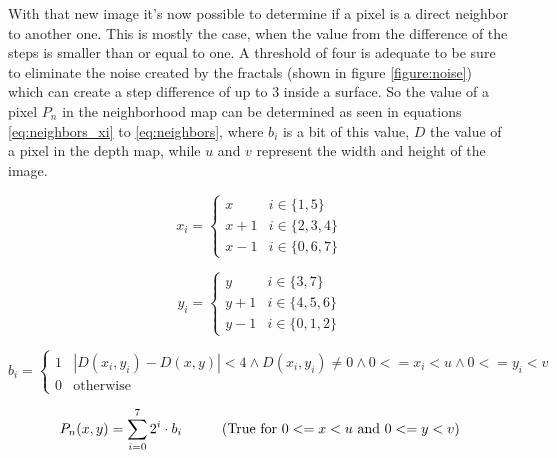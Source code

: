 \newpage
With that new image it's now possible to determine if a pixel is a direct neighbor to another one. This is mostly the case,
when the value from the difference of the steps is smaller than or equal to one. A threshold of four is adequate to be sure 
to eliminate the noise created by the fractals (shown in figure \vref{figure:noise}) 
which can create a step difference of up to 3 inside a surface. So the value of a pixel $P_n$ in the neighborhood map
can be determined as seen in equations \vref{eq:neighbors_xi} to \vref{eq:neighbors}, where $b_i$ is a bit of this value, 
$D$ the value of a pixel in the depth map, while $u$ and $v$ represent the width and height of the image. 


\begin{equation}
 x_i = \left\{ 
	 \begin{array}{ll}
	         x   & i \in \{1,5\} \\
	         x+1 & i \in \{2,3,4\} \\
	         x-1 & i \in \{0,6,7\} 
	 \end{array} 
\right.        
\label{eq:neighbors_xi} 
\end{equation}


\begin{equation}
 y_i = \left\{ 
	 \begin{array}{ll}
	         y   & i \in \{3,7\} \\
	         y+1 & i \in \{4,5,6\} \\
	         y-1 & i \in \{0,1,2\} 
	 \end{array} 
\right.        
\label{eq:neighbors_yi} 
\end{equation}



\begin{equation}
 b_i = \left\{ 
	 \begin{array}{ll}
	         1 & \left|D(x_i,y_i)-D(x,y)\right|<4  \wedge   D(x_i,y_i) \neq 0 \wedge 0<=x_i<u  \wedge 0<=y_i<v\\
	         0 & \mbox{otherwise} 
	 \end{array}
\right.        
\label{eq:neighbors_bit} 
\end{equation}

\begin{equation}
	P_n(x,y)=\sum_{i=0}^7 2^i \cdot b_i \mbox{\hspace{1cm}(True for $0<=x<u$ and $0<=y<v$)}
\label{eq:neighbors} 
\end{equation}

